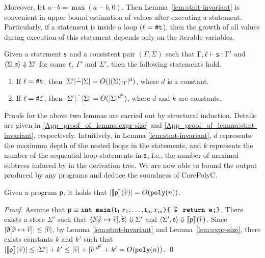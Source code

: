 \documentclass[runningheads]{llncs}
\begin{document}
Moreover, let $a \dot{-} b = \max(a - b, 0)$.
Then Lemma~\ref{lem:stmt-invariant} is convenient in upper bound estimation of values after executing a statement.
Particularly, if a statement is inside a loop ($\ell=\texttt{\#}\mathtt{t}$), then the growth of all values during execution of this statement depends only on the iterable variables.

\begin{lemma}
\label{lem:stmt-invariant}
Given a statement $\mathsf{s}$ and a consistent pair $(\Gamma, \Sigma)$ such that $\Gamma,\ell\vdash\mathsf{s}:\Gamma'$ and $\langle\Sigma,\mathsf{s}\rangle\Downarrow{\Sigma'}$ for some $\ell$, $\Gamma'$ and $\Sigma'$, then the following statements hold.
\begin{enumerate}
    \item If $\ell=\texttt{\#}\mathtt{t}$, then $\vert\Sigma'\vert\dot{-}\vert\Sigma\vert=O(\vert{(\Sigma)_{\restriction \Gamma}}\vert^d)$, where $d$ is a constant.
    \item If $\ell=\texttt{\#}\mathtt{f}$, then $\vert\Sigma'\vert\dot{-}\vert\Sigma\vert= O(\vert\Sigma\vert^{d^{k}})$, where $d$ and $k$ are constants.
\end{enumerate}
\end{lemma}
Proofs for the above two lemmas are carried out by structural induction.
Details are given in   \ref{App_proof_of_lemma:expr-size} and \ref{App_proof_of_lemma:stmt-invariant}, respectively.
Intuitively, in Lemma \ref{lem:stmt-invariant},
$d$ represents the maximum depth of the nested loops in the statements, and $k$ represents the number of the sequential loop statements in $\mathsf{s}$, i.e., the number of maximal subtrees induced by  in the derivation tree.
We are now able to bound the output produced by any programs and deduce the soundness of CorePolyC.

\begin{proposition}\label{prop:prog-size}
Given a program $\mathsf{p}$, it holds that $\vert\llbracket\mathsf{p}\rrbracket_{}(\widetilde{v})\vert=O(\mathtt{poly}(n))$.
\end{proposition}

\begin{proof}
Assume that $\mathsf{p}\equiv \texttt{\textbf{int main}(}\mathsf{t}_1\,x_1,\dots,\mathsf{t}_m\,x_m\texttt{)\{ }\widetilde{\mathsf{s}}\;\texttt{ \textbf{return} e;\}}$.
There exists a store $\Sigma'$ such that $\langle\emptyset[\widetilde{x}\mapsto\widetilde{v}],\widetilde{\mathsf{s}}\rangle\Downarrow{\Sigma'}$ and $\langle\Sigma',\mathsf{e}\rangle\Downarrow{\llbracket\mathsf{p}\rrbracket_{}(\widetilde{v})}$.
Since $\vert\emptyset[\widetilde{x}\mapsto\widetilde{v}]\vert\le \vert\widetilde{v}\vert$, by Lemma \ref{lem:stmt-invariant} and Lemma~\ref{lem:expr-size}, there exists constants $k$ and $k'$ such that
$\vert\llbracket\mathsf{p}\rrbracket_{}(\widetilde{v})\vert\le \vert\Sigma'\vert+k'\le\vert\widetilde{v}\vert+\vert\widetilde{v}\vert^{d^{k}}+k'= O(\mathtt{poly}(n))$.
\qed
\end{proof}
\end{document}
